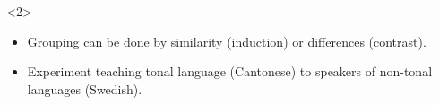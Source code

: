 \begin{frame}\label<1>{vtgrouping}
  \begin{example}
    \begin{onlyenv}<2>
      \begin{itemize}
        \item Grouping can be done by similarity (induction) or differences 
          (contrast).
        \item Experiment teaching tonal language (\eg Cantonese) to speakers of 
          non-tonal languages (\eg Swedish).
      \end{itemize}
    \end{onlyenv}
  \end{example}

  \begin{figure}
  \end{figure}
\end{frame}

